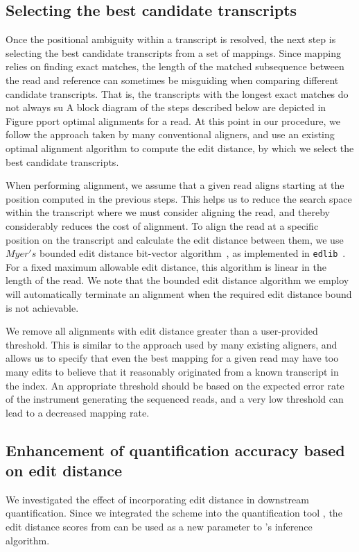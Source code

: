 \subsection{Selecting the best candidate transcripts}
Once the positional ambiguity within a transcript is resolved, the next step is selecting the best candidate transcripts from a set of mappings. Since mapping relies on finding exact matches, the length of the matched subsequence between the read and reference can sometimes be misguiding when comparing different candidate transcripts. That is, the transcripts with the longest exact matches do not always su A block diagram of the steps described below are depicted in Figure pport optimal alignments for a read.  At this point in our procedure, we follow the approach taken by many conventional aligners, and use an existing optimal alignment algorithm to compute the edit distance, by which we select the best candidate transcripts.

When performing alignment, we assume that a given read aligns starting at the position computed in the previous steps.  This helps us to reduce the search space within the transcript where we must consider aligning the read, and thereby considerably reduces the cost of alignment. To align the read at a specific position on the transcript and calculate the edit distance between them, we use $Myer's$ bounded edit distance bit-vector algorithm~\citep{myers1999fast}, as implemented in \texttt{edlib}~\citep{edlib}.  For a fixed maximum allowable edit distance, this algorithm is linear in the length of the read. We note that the bounded edit distance algorithm we employ will automatically terminate an alignment when the required edit distance bound is not achievable.

We remove all alignments with edit distance greater than a user-provided threshold. This is similar to the approach used by many existing aligners, and allows us to specify that even the best mapping for a given read may have too many edits to believe that it reasonably originated from a known transcript in the index. An appropriate threshold should be based on the expected error rate of the instrument generating the sequenced reads, and a very low threshold can lead to a decreased mapping rate.

\subsection{Enhancement of quantification accuracy based on edit distance}\label{filter}
We investigated the effect of incorporating edit distance in downstream quantification. Since we integrated the \sla scheme into the quantification tool \salmon \citep{Patro2017Salmon}, the edit distance scores from \sla can be used as a new parameter to \salmon{}'s inference algorithm.

